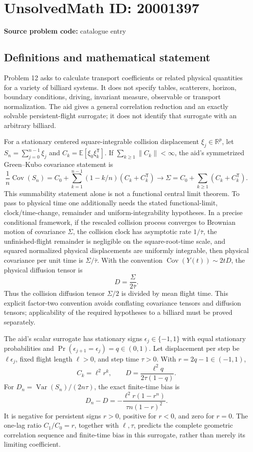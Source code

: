 \documentclass[11pt]{article}
\newcommand{\R}{\mathbb{R}}
\newcommand{\E}{\mathbb{E}}
\begin{document}
\section*{UnsolvedMath ID: 20001397}
\textbf{Source problem code:} catalogue entry
\subsection{Definitions and mathematical statement}
Problem 12 asks to calculate transport coefficients or related physical quantities for a variety of billiard systems. It does not specify tables, scatterers, horizon, boundary conditions, driving, invariant measure, observable or transport normalization. The aid gives a general correlation reduction and an exactly solvable persistent-flight surrogate; it does not identify that surrogate with an arbitrary billiard.

For a stationary centered square-integrable collision displacement \(\xi_j\in\R^p\), let \(S_n=\sum_{j=0}^{n-1}\xi_j\) and \(C_k=\E[\xi_0\xi_k^{\mathsf T}]\). If \(\sum_{k\ge1}\|C_k\|<\infty\), the aid's symmetrized Green--Kubo covariance statement is
\[
\frac1n\operatorname{Cov}(S_n)=C_0+\sum_{k=1}^{n-1}(1-k/n)(C_k+C_k^{\mathsf T})\longrightarrow
\Sigma=C_0+\sum_{k\ge1}(C_k+C_k^{\mathsf T}).
\]
This summability statement alone is not a functional central limit theorem. To pass to physical time one additionally needs the stated functional-limit, clock/time-change, remainder and uniform-integrability hypotheses. In a precise conditional framework, if the rescaled collision process converges to Brownian motion of covariance \(\Sigma\), the collision clock has asymptotic rate \(1/\bar\tau\), the unfinished-flight remainder is negligible on the square-root-time scale, and squared normalized physical displacements are uniformly integrable, then physical covariance per unit time is \(\Sigma/\bar\tau\). With the convention \(\operatorname{Cov}(Y(t))\sim2tD\), the physical diffusion tensor is
\[
D=\frac{\Sigma}{2\bar\tau}.
\]
Thus the collision diffusion tensor \(\Sigma/2\) is divided by mean flight time. This explicit factor-two convention avoids conflating covariance tensors and diffusion tensors; applicability of the required hypotheses to a billiard must be proved separately.

The aid's scalar surrogate has stationary signs \(\epsilon_j\in\{-1,1\}\) with equal stationary probabilities and \(\Pr(\epsilon_{j+1}=\epsilon_j)=q\in(0,1)\). Let displacement per step be \(\ell\epsilon_j\), fixed flight length \(\ell>0\), and step time \(\tau>0\). With \(r=2q-1\in(-1,1)\),
\[
C_k=\ell^2r^k,\qquad D=\frac{\ell^2q}{2\tau(1-q)}.
\]
For \(D_n=\operatorname{Var}(S_n)/(2n\tau)\), the exact finite-time bias is
\[
D_n-D=-\frac{\ell^2r(1-r^n)}{\tau n(1-r)^2}.
\]
It is negative for persistent signs \(r>0\), positive for \(r<0\), and zero for \(r=0\). The one-lag ratio \(C_1/C_0=r\), together with \(\ell,\tau\), predicts the complete geometric correlation sequence and finite-time bias in this surrogate, rather than merely its limiting coefficient.
\end{document}
